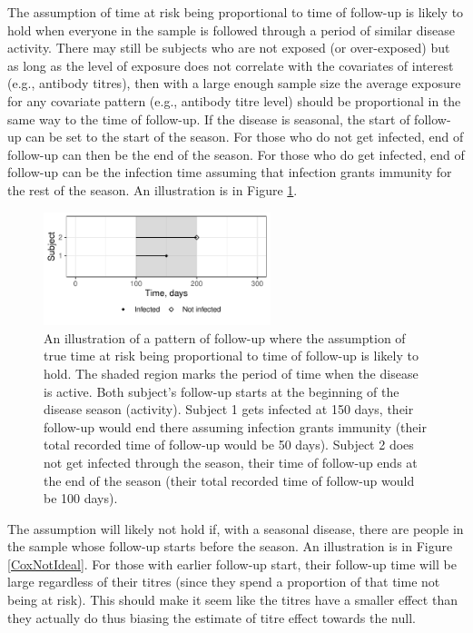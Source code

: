 The assumption of time at risk being proportional to time of follow-up is likely to hold when everyone in the sample is followed through a period of similar disease activity. There may still be subjects who are not exposed (or over-exposed) but as long as the level of exposure does not correlate with the covariates of interest (e.g., antibody titres), then with a large enough sample size the average exposure for any covariate pattern (e.g., antibody titre level) should be proportional in the same way to the time of follow-up. If the disease is seasonal, the start of follow-up can be set to the start of the season. For those who do not get infected, end of follow-up can then be the end of the season. For those who do get infected, end of follow-up can be the infection time assuming that infection grants immunity for the rest of the season. An illustration is in Figure \ref{CoxIdeal}.

\begin{figure}[htp]
	\centering
	\includegraphics[width=0.59\textwidth]{../curve-cox/timeplot_3_light.pdf}
	\caption{
	An illustration of a pattern of follow-up where the assumption of true time at risk being proportional to time of follow-up is likely to hold. The shaded region marks the period of time when the disease is active. Both subject's follow-up starts at the beginning of the disease season (activity). Subject 1 gets infected at 150 days, their follow-up would end there assuming infection grants immunity (their total recorded time of follow-up would be 50 days). Subject 2 does not get infected through the season, their time of follow-up ends at the end of the season (their total recorded time of follow-up would be 100 days).
	}
	\label{CoxIdeal}
\end{figure}

The assumption will likely not hold if, with a seasonal disease, there are people in the sample whose follow-up starts before the season. An illustration is in Figure \ref{CoxNotIdeal}. For those with earlier follow-up start, their follow-up time will be large regardless of their titres (since they spend a proportion of that time not being at risk). This should make it seem like the titres have a smaller effect than they actually do thus biasing the estimate of titre effect towards the null.

